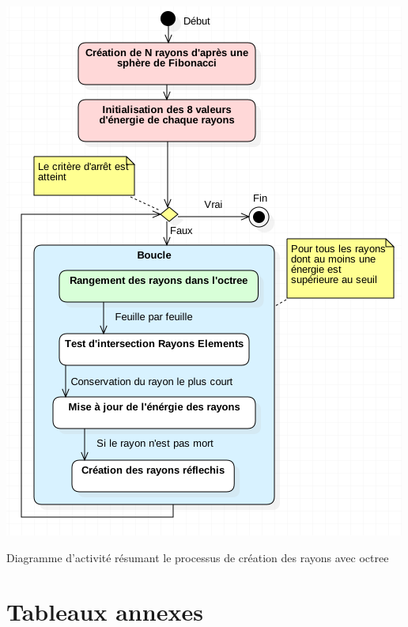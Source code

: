 %	
%
%
%

\begin{figureth}
	\includegraphics[width=0.7\linewidth]{images/DiagRay2}
	\caption{Diagramme d'activité résumant le processus de création des rayons avec \gls{octree}}
	\label{DiagRay2}
\end{figureth}	

\section{Tableaux annexes}




 
 
